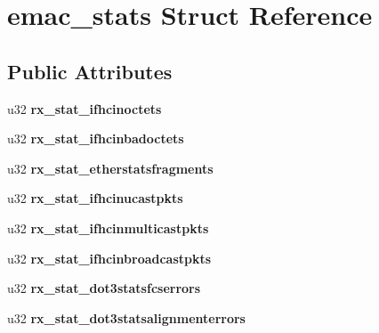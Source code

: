 \hypertarget{structemac__stats}{
\section{emac\_\-stats Struct Reference}
\label{structemac__stats}
}
\subsection*{Public Attributes}
\begin{DoxyCompactItemize}
\item 
\hypertarget{structemac__stats_a2acec161c060b3e070e0972346a0466e}{
u32 {\bfseries rx\_\-stat\_\-ifhcinoctets}}
\label{structemac__stats_a2acec161c060b3e070e0972346a0466e}

\item 
\hypertarget{structemac__stats_abee17fa164f0e956e6c68c76e6df07dc}{
u32 {\bfseries rx\_\-stat\_\-ifhcinbadoctets}}
\label{structemac__stats_abee17fa164f0e956e6c68c76e6df07dc}

\item 
\hypertarget{structemac__stats_ab21335b437cbf2e2db59ecc9f89f0681}{
u32 {\bfseries rx\_\-stat\_\-etherstatsfragments}}
\label{structemac__stats_ab21335b437cbf2e2db59ecc9f89f0681}

\item 
\hypertarget{structemac__stats_aa5795b169758dba072067572c6db00d1}{
u32 {\bfseries rx\_\-stat\_\-ifhcinucastpkts}}
\label{structemac__stats_aa5795b169758dba072067572c6db00d1}

\item 
\hypertarget{structemac__stats_a5fcdae8a57b8342a8a9541e518ccddae}{
u32 {\bfseries rx\_\-stat\_\-ifhcinmulticastpkts}}
\label{structemac__stats_a5fcdae8a57b8342a8a9541e518ccddae}

\item 
\hypertarget{structemac__stats_a834abe726c3e431098a57fa7600b5e4f}{
u32 {\bfseries rx\_\-stat\_\-ifhcinbroadcastpkts}}
\label{structemac__stats_a834abe726c3e431098a57fa7600b5e4f}

\item 
\hypertarget{structemac__stats_a20f1b1a9022a5a0b6b75f8492821a8ab}{
u32 {\bfseries rx\_\-stat\_\-dot3statsfcserrors}}
\label{structemac__stats_a20f1b1a9022a5a0b6b75f8492821a8ab}

\item 
\hypertarget{structemac__stats_aa4a5ccbac21f2dea1814971b2b948b10}{
u32 {\bfseries rx\_\-stat\_\-dot3statsalignmenterrors}}
\label{structemac__stats_aa4a5ccbac21f2dea1814971b2b948b10}


\end{DoxyCompactItemize}

